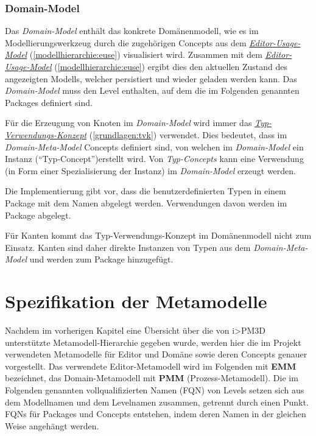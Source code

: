 \documentclass[a4paper,10pt]{sphinxmanual}
\begin{document}
\subsection{Domain-Model}
\label{modellhierarchie:domain-model}\label{modellhierarchie:id8}
Das \emph{Domain-Model} enthält das konkrete Domänenmodell, wie es im Modellierungswerkzeug durch die zugehörigen Concepts aus dem {\hyperref[modellhierarchie:euse]{\emph{Editor-Usage-Model}}} (\autoref*{modellhierarchie:euse}) visualisiert wird.
Zusammen mit dem {\hyperref[modellhierarchie:euse]{\emph{Editor-Usage-Model}}} (\autoref*{modellhierarchie:euse}) ergibt dies den aktuellen Zustand des angezeigten Modells, welcher persistiert und wieder geladen werden kann.
Das \emph{Domain-Model} muss den Level  enthalten, auf dem die im Folgenden genannten Packages definiert sind.

Für die Erzeugung von Knoten im \emph{Domain-Model} wird immer das {\hyperref[grundlagen:tvk]{\emph{Typ-Verwendungs-Konzept}}} (\autoref*{grundlagen:tvk}) verwendet.
Dies bedeutet, dass im \emph{Domain-Meta-Model} Concepts definiert sind, von welchen im \emph{Domain-Model} ein Instanz ("`Typ-Concept"')erstellt wird.
Von \emph{Typ-Concepts} kann eine Verwendung (in Form einer Spezialisierung der Instanz) im \emph{Domain-Model} erzeugt werden.

Die Implementierung gibt vor, dass die benutzerdefinierten Typen in einem Package mit dem Namen  abgelegt werden.
Verwendungen davon werden im Package  abgelegt.

Für Kanten kommt das Typ-Verwendungs-Konzept im Domänenmodell nicht zum Einsatz.
Kanten sind daher direkte Instanzen von Typen aus dem \emph{Domain-Meta-Model} und werden zum Package  hinzugefügt.


\chapter{Spezifikation der Metamodelle}
\label{metamodelle:metamodelle}\label{metamodelle:spezifikation-der-metamodelle}\label{metamodelle::doc}
Nachdem im vorherigen Kapitel eine Übersicht über die von i\textgreater{}PM3D unterstützte Metamodell-Hierarchie gegeben wurde, werden hier die im Projekt verwendeten Metamodelle für Editor und Domäne sowie deren Concepts genauer vorgestellt.
Das verwendete Editor-Metamodell wird im Folgenden mit \textbf{EMM} bezeichnet, das Domain-Metamodell mit \textbf{PMM} (Prozess-Metamodell).
Die im Folgenden genannten vollqualifizierten Namen (FQN) von Levels setzen sich aus dem Modellnamen und dem Levelnamen zusammen, getrennt durch einen Punkt.
FQNs für Packages und Concepts entstehen, indem deren Namen in der gleichen Weise angehängt werden.
\end{document}
